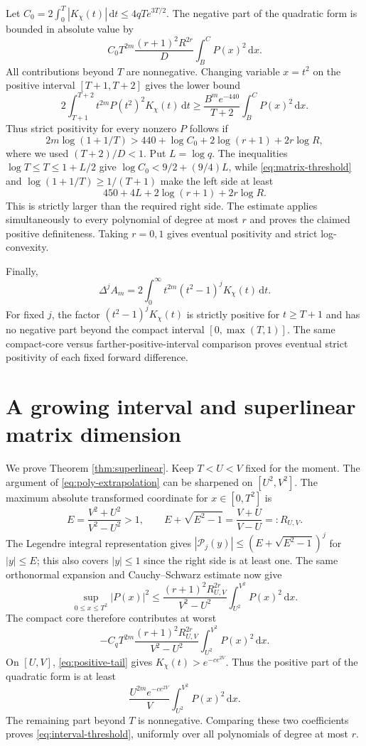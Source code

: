 \documentclass[11pt]{article}
\newcommand{\dd}{\,\mathrm d}
\begin{document}
Let $C_0=2\int_0^T|K_\chi(t)|\dd t\le4qTe^{3T/2}$. The negative part of the quadratic form is bounded in absolute value by
\[
 C_0T^{2m}\frac{(r+1)^2R^{2r}}D\int_B^C P(x)^2\dd x.
\]
All contributions beyond $T$ are nonnegative. Changing variable $x=t^2$ on the positive interval $[T+1,T+2]$ gives the lower bound
\[
 2\int_{T+1}^{T+2}t^{2m}P(t^2)^2K_\chi(t)\dd t
 \ge\frac{B^me^{-440}}{T+2}\int_B^CP(x)^2\dd x.
\]
Thus strict positivity for every nonzero $P$ follows if
\[
 2m\log(1+1/T)>440+\log C_0+2\log(r+1)+2r\log R,
\]
where we used $(T+2)/D<1$. Put $L=\log q$. The inequalities $\log T\le T\le1+L/2$ give $\log C_0<9/2+(9/4)L$, while \eqref{eq:matrix-threshold} and $\log(1+1/T)\ge1/(T+1)$ make the left side at least
\[
 450+4L+2\log(r+1)+2r\log R.
\]
This is strictly larger than the required right side. The estimate applies simultaneously to every polynomial of degree at most $r$ and proves the claimed positive definiteness. Taking $r=0,1$ gives eventual positivity and strict log-convexity.

Finally,
\[
 \Delta^j A_m=2\int_0^\infty t^{2m}(t^2-1)^jK_\chi(t)\dd t.
\]
For fixed $j$, the factor $(t^2-1)^jK_\chi(t)$ is strictly positive for $t\ge T+1$ and has no negative part beyond the compact interval $[0,\max(T,1)]$. The same compact-core versus farther-positive-interval comparison proves eventual strict positivity of each fixed forward difference.

\section{A growing interval and superlinear matrix dimension}
We prove Theorem \ref{thm:superlinear}.
Keep $T<U<V$ fixed for the moment. The argument of \eqref{eq:poly-extrapolation} can be sharpened on $[U^2,V^2]$. The maximum absolute transformed coordinate for $x\in[0,T^2]$ is
\[
 E=\frac{V^2+U^2}{V^2-U^2}>1,
 \qquad E+\sqrt{E^2-1}=\frac{V+U}{V-U}=:R_{U,V}.
\]
The Legendre integral representation gives $|\mathcal P_j(y)|\le(E+\sqrt{E^2-1})^j$ for $|y|\le E$; this also covers $|y|\le1$ since the right side is at least one. The same orthonormal expansion and Cauchy--Schwarz estimate now give
\[
 \sup_{0\le x\le T^2}|P(x)|^2
 \le\frac{(r+1)^2R_{U,V}^{2r}}{V^2-U^2}
 \int_{U^2}^{V^2}P(x)^2\dd x.
\]
The compact core therefore contributes at worst
\[
 -C_q T^{2m}\frac{(r+1)^2R_{U,V}^{2r}}{V^2-U^2}
 \int_{U^2}^{V^2}P(x)^2\dd x.
\]
On $[U,V]$, \eqref{eq:positive-tail} gives $K_\chi(t)>e^{-ce^{2V}}$. Thus the positive part of the quadratic form is at least
\[
 \frac{U^{2m}e^{-ce^{2V}}}{V}
 \int_{U^2}^{V^2}P(x)^2\dd x.
\]
The remaining part beyond $T$ is nonnegative. Comparing these two coefficients proves \eqref{eq:interval-threshold}, uniformly over all polynomials of degree at most $r$.
\end{document}
